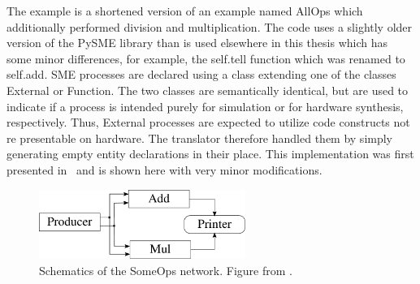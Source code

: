 The example is a shortened version of an example named AllOps which additionally
performed division and multiplication.
The code uses a slightly older version of the PySME library than is used
elsewhere in this thesis which has some minor differences, for example, the
{\ttfamily self.tell} function which was renamed to {\ttfamily self.add}.  SME
processes are declared using a class extending one of the classes {\ttfamily
  External} or {\ttfamily Function}. The two classes are semantically identical,
but are used to indicate if a process is intended purely for simulation or for
hardware synthesis, respectively. Thus, {\ttfamily External} processes are
expected to utilize code constructs not re presentable on hardware.  The
translator therefore handled them by simply generating empty entity declarations
in their place. This implementation was first presented in~\cite{asheim2016vhdl}
and is shown here with very minor modifications.


\begin{figure}
  \centering
  \includegraphics[width=0.6\textwidth]{figures/someopsnet.pdf}
  \caption{Schematics of the SomeOps network. Figure from \cite{asheim2016vhdl}.}
  \label{fig:someops}
\end{figure}

